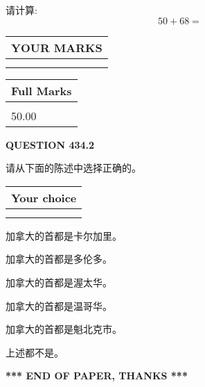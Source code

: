 \documentclass{ctexart}
\begin{document}
  
 
请计算:
\begin{equation}
50 +  %
68 = \nonumber
\end{equation}
 

 

 
  
\vspace{0.2in}
  
\noindent\begin{tabular}{|l|}
\hline
 YOUR MARKS  \\
\hline
 \\ 
 \\ 
\hline
\end{tabular}
\hspace{0.05in} \begin{tabular}{|l|}
\hline
 Full Marks  \\
\hline
 \\ 
50.00 \\
\hline
\end{tabular}
{\textbf{\Large{QUESTION
434.2 
}}}
  
  
请从下面的陈述中选择正确的。
  
  
\noindent\hspace{3.0in} \begin{tabular}{|l|}
\hline
Your choice \\
\hline
 \\ 
 \\ 
\hline
\end{tabular}
  
  
 
 
加拿大的首都是卡尔加里。
 
 
加拿大的首都是多伦多。
 
 
加拿大的首都是渥太华。
 
 
加拿大的首都是温哥华。
 
 
加拿大的首都是魁北克市。
 
 
 上述都不是。
 
 
   
   
 \vspace{0.2in}
 
   
   
   
   
\vspace{1.0in} 
{\textbf{\large{ *** END OF PAPER, THANKS *** }}} 
   
\end{document}
